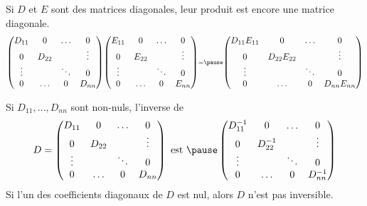 \begin{frame}
  \begin{remark*}
    Si \(D\) et \(E\) sont des matrices diagonales, leur produit est encore une matrice diagonale.
    \begin{equation*}\scriptstyle
      \begin{pmatrix}
        D_{11}       & 0            & \ldots & 0      \\
        0            & D_{22}       &        & \vdots \\
        \vdots       &              & \ddots & 0      \\
        0            & \ldots       & 0      & D_{nn}
      \end{pmatrix}
      \begin{pmatrix}
        E_{11}       & 0            & \ldots & 0      \\
        0            & E_{22}       &        & \vdots \\
        \vdots       &              & \ddots & 0      \\
        0            & \ldots       & 0      & E_{nn}
      \end{pmatrix}
      = \pause
      \begin{pmatrix}
        D_{11}E_{11} & 0            & \ldots & 0      \\
        0            & D_{22}E_{22} &        & \vdots \\
        \vdots       &              & \ddots & 0      \\
        0            & \ldots       & 0      & D_{nn}E_{nn}
      \end{pmatrix}
    \end{equation*}
  \end{remark*}
  \begin{proposition}Si \(D_{11}, \ldots, D_{nn}\) sont non-nuls, l'inverse de
    \begin{equation*}
      D = \begin{pmatrix}
        D_{11}       & 0            & \ldots & 0      \\
        0            & D_{22}       &        & \vdots \\
        \vdots       &              & \ddots & 0      \\
        0            & \ldots       & 0      & D_{nn}
      \end{pmatrix}
      \text{ est }\pause
      \begin{pmatrix}
        D_{11}^{-1}  & 0            & \ldots & 0      \\
        0            & D_{22}^{-1}  &        & \vdots \\
        \vdots       &              & \ddots & 0      \\
        0            & \ldots       & 0      & D_{nn}^{-1}
      \end{pmatrix}
    \end{equation*}\pause{}
    Si l'un des coefficients diagonaux de \(D\) est nul, alors \(D\) n'est pas inversible.
  \end{proposition}
\end{frame}
